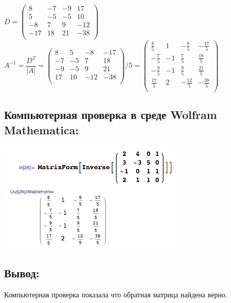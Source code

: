 $
	D =
	\begin{pmatrix}
		8 & -7 & -9 & 17 \\
		5 & -5 & -5 & 10 \\
		-8 & 7 & 9 & -12 \\
		-17 & 18 & 21 & -38 \\
	\end{pmatrix}
$
\\[1em]
$
	A^{-1} = \dfrac{D^T}{|A|} =
	\begin{pmatrix}
		8 & 5 & -8 & -17 \\
		-7 & -5 & 7 & 18 \\
		-9 & -5 & 9 & 21 \\
		17 & 10 & -12 & -38 \\
	\end{pmatrix}
	/ 5
	=
	\begin{pmatrix}
		\frac{8}{5} & 1 & -\frac{8}{5} & -\frac{17}{5} \\
		-\frac{7}{5} & -1 & \frac{7}{5} & \frac{18}{5} \\
		-\frac{9}{5} & -1 & \frac{9}{5} & \frac{21}{5} \\
		\frac{17}{5} & 2 & -\frac{12}{5} & -\frac{38}{5} \\
	\end{pmatrix}
$
\subsection{Компьютерная проверка в среде Wolfram Mathematica:}
\includegraphics[scale=0.6]{task/1_25/screen1.png}
\subsection{Вывод:}
Компьютерная проверка показала что обратная матрица найдена верно.
